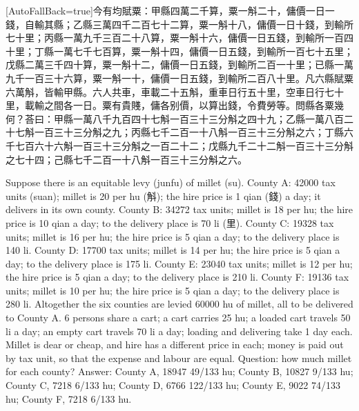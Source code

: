 \documentclass[11pt]{article}
\newcommand{\unitlabel}[1]{\marginpar{\raggedleft\tiny\color{gray}#1}}
\newenvironment{unitzh}{\par\CJKfontspec{Noto Serif CJK SC}[AutoFallBack=true]\large\linespread{1.25}\selectfont}{\par}
\newenvironment{uniten}{\par\small\color{black!85}}{\par\medskip}
\begin{document}
\begin{unitzh}\unitlabel{jiuzhang-024.1}今有均賦粟：甲縣四萬二千算，粟一斛二十，傭價一日一錢，自輸其縣；乙縣三萬四千二百七十二算，粟一斛十八，傭價一日十錢，到輸所七十里；丙縣一萬九千三百二十八算，粟一斛十六，傭價一日五錢，到輸所一百四十里；丁縣一萬七千七百算，粟一斛十四，傭價一日五錢，到輸所一百七十五里；戊縣二萬三千四十算，粟一斛十二，傭價一日五錢，到輸所二百一十里；已縣一萬九千一百三十六算，粟一斛一十，傭價一日五錢，到輸所二百八十里。凡六縣賦粟六萬斛，皆輸甲縣。六人共車，車載二十五斛，重車日行五十里，空車日行七十里，載輸之間各一日。粟有貴賤，傭各别價，以算出錢，令費勞等。問縣各粟幾何？荅曰：甲縣一萬八千九百四十七斛一百三十三分斛之四十九；乙縣一萬八百二十七斛一百三十三分斛之九；丙縣七千二百一十八斛一百三十三分斛之六；丁縣六千七百六十六斛一百三十三分斛之一百二十二；戊縣九千二十二斛一百三十三分斛之七十四；己縣七千二百一十八斛一百三十三分斛之六。\end{unitzh}
\begin{uniten}Suppose there is an equitable levy (junfu) of millet (su). County A: 42000 tax units (suan); millet is 20 per hu (斛); the hire price is 1 qian (錢) a day; it delivers in its own county. County B: 34272 tax units; millet is 18 per hu; the hire price is 10 qian a day; to the delivery place is 70 li (里). County C: 19328 tax units; millet is 16 per hu; the hire price is 5 qian a day; to the delivery place is 140 li. County D: 17700 tax units; millet is 14 per hu; the hire price is 5 qian a day; to the delivery place is 175 li. County E: 23040 tax units; millet is 12 per hu; the hire price is 5 qian a day; to the delivery place is 210 li. County F: 19136 tax units; millet is 10 per hu; the hire price is 5 qian a day; to the delivery place is 280 li. Altogether the six counties are levied 60000 hu of millet, all to be delivered to County A. 6 persons share a cart; a cart carries 25 hu; a loaded cart travels 50 li a day; an empty cart travels 70 li a day; loading and delivering take 1 day each. Millet is dear or cheap, and hire has a different price in each; money is paid out by tax unit, so that the expense and labour are equal. Question: how much millet for each county?
Answer: County A, 18947 49/133 hu; County B, 10827 9/133 hu; County C, 7218 6/133 hu; County D, 6766 122/133 hu; County E, 9022 74/133 hu; County F, 7218 6/133 hu.\end{uniten}
\end{document}
